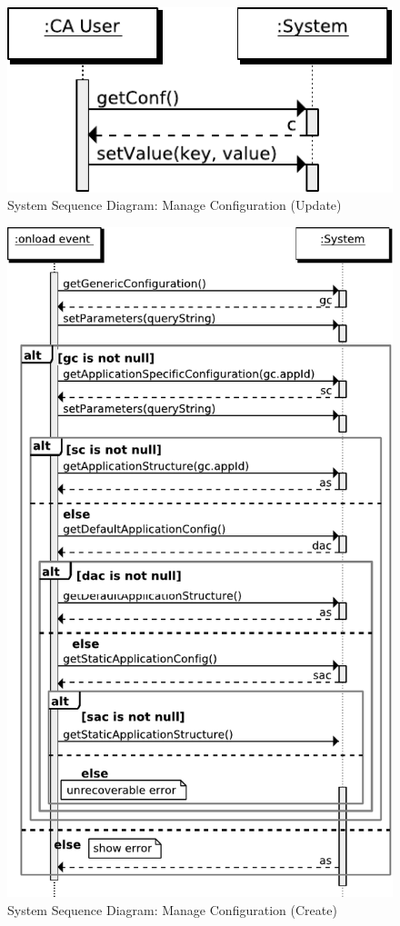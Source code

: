 \begin{figure}[htb]
    \centering
    \includegraphics{figures/spec-seq-manage-conf-update.pdf}
    \caption{System Sequence Diagram: Manage Configuration (Update)}
    \label{fig:spec-manage-conf-update}
\end{figure}

\begin{figure}[htb]
    \centering
    \includegraphics{figures/spec-seq-manage-conf-create.pdf}
    \caption{System Sequence Diagram: Manage Configuration (Create)}
    \label{fig:spec-manage-conf-create}
\end{figure}

